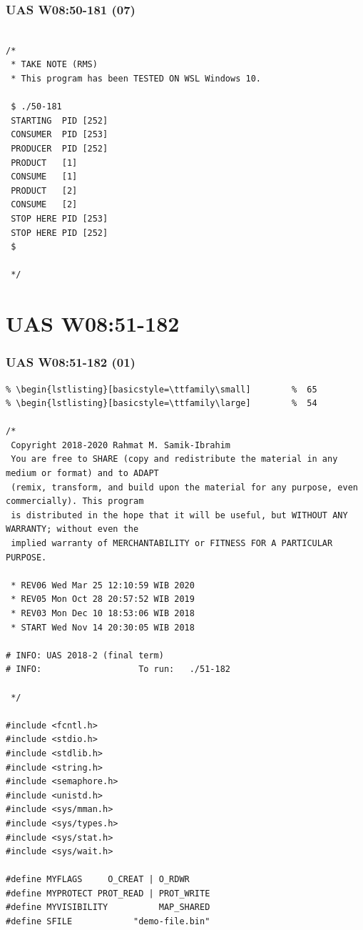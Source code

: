 \documentclass[aspectratio=169, xcolor=table, notheorems, hyperref={pdfpagelabels=false}]{beamer}
\begin{document}
\begin{frame}[fragile]
\frametitle{UAS W08:50-181 (07)}
\begin{lstlisting}[basicstyle=\ttfamily\large]        %  54

/*
 * TAKE NOTE (RMS)
 * This program has been TESTED ON WSL Windows 10.

 $ ./50-181
 STARTING  PID [252]
 CONSUMER  PID [253]
 PRODUCER  PID [252]
 PRODUCT   [1]
 CONSUME   [1]
 PRODUCT   [2]
 CONSUME   [2]
 STOP HERE PID [253]
 STOP HERE PID [252]
 $

 */

\end{lstlisting}
\end{frame}

\section{UAS W08:51-182}
\begin{frame}[fragile]
\frametitle{UAS W08:51-182 (01)}
\begin{lstlisting}[basicstyle=\ttfamily\tiny]         % 108
% \begin{lstlisting}[basicstyle=\ttfamily\footnotesize] %  72
% \begin{lstlisting}[basicstyle=\ttfamily\small]        %  65
% \begin{lstlisting}[basicstyle=\ttfamily\large]        %  54

/*
 Copyright 2018-2020 Rahmat M. Samik-Ibrahim
 You are free to SHARE (copy and redistribute the material in any medium or format) and to ADAPT 
 (remix, transform, and build upon the material for any purpose, even commercially). This program
 is distributed in the hope that it will be useful, but WITHOUT ANY WARRANTY; without even the 
 implied warranty of MERCHANTABILITY or FITNESS FOR A PARTICULAR PURPOSE.
 
 * REV06 Wed Mar 25 12:10:59 WIB 2020
 * REV05 Mon Oct 28 20:57:52 WIB 2019
 * REV03 Mon Dec 10 18:53:06 WIB 2018
 * START Wed Nov 14 20:30:05 WIB 2018

# INFO: UAS 2018-2 (final term)
# INFO:                   To run:   ./51-182 

 */

#include <fcntl.h>
#include <stdio.h>
#include <stdlib.h>
#include <string.h>
#include <semaphore.h>
#include <unistd.h>
#include <sys/mman.h>
#include <sys/types.h>
#include <sys/stat.h>
#include <sys/wait.h>

#define MYFLAGS     O_CREAT | O_RDWR
#define MYPROTECT PROT_READ | PROT_WRITE
#define MYVISIBILITY          MAP_SHARED
#define SFILE            "demo-file.bin"

\end{lstlisting}
\end{frame}
\end{document}
